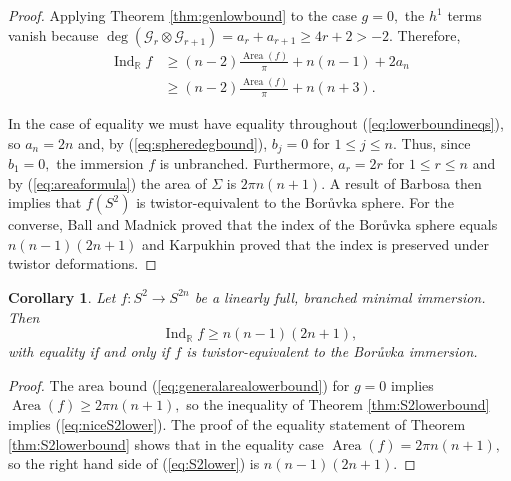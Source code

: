 \documentclass[11pt]{article}
\newtheorem{cor}[theorem]{Corollary}
\theoremstyle{definition}
\newcommand{\R}{\mathbb{R}}
\numberwithin{equation}{section}
\begin{document}
\begin{proof} 
	Applying Theorem \ref{thm:genlowbound} to the case $g=0,$ the $h^1$ terms vanish because $\deg (\mathcal{G}_r \otimes \mathcal{G}_{r+1}) = a_r+a_{r+1} \geq 4r+2 > -2.$ Therefore,
	\begin{equation}\label{eq:lowerboundineqs}
		\begin{aligned}
			\operatorname{Ind}_\R f & \geq (n-2) \frac{\operatorname{Area}(f)}{\pi} + n(n-1) + 2a_n \\
			                  & \geq (n-2) \frac{\operatorname{Area}(f)}{\pi} + {n(n+3)}.     
		\end{aligned}
	\end{equation}
	
	In the case of equality we must have equality throughout (\ref{eq:lowerboundineqs}), so $a_n = 2n$ and, by (\ref{eq:spheredegbound}), $b_j = 0$ for $1 \leq j \leq n.$ Thus, since $b_1 = 0,$ the immersion $f$ is unbranched. Furthermore, $a_r = 2r$ for $1 \leq r \leq n$ and by (\ref{eq:areaformula}) the area of $\Sigma$ is $2 \pi n(n+1).$ A result of Barbosa \cite{Barbosa75} then implies that $f(S^2)$ is twistor-equivalent to the Bor\r{u}vka sphere. For the converse, Ball and Madnick \cite{BallMadnick26} proved that the index of the Bor\r{u}vka sphere equals $n(n-1)(2n+1)$ and Karpukhin \cite[Cor 3.10]{Karpukhin21} proved that the index is preserved under twistor deformations.
\end{proof}

\begin{cor}\label{cor:S2boruvlowerindex}
	Let $f: S^2 \to S^{2n}$ be a linearly full, branched minimal immersion. Then
	\begin{equation}\label{eq:niceS2lower}
		\operatorname{Ind}_\R f \geq n(n-1)(2n+1),
	\end{equation}
	with equality if and only if $f$ is twistor-equivalent to the Bor\r{u}vka immersion.
\end{cor}

\begin{proof}
	The area bound (\ref{eq:generalarealowerbound}) for $g=0$ implies $\operatorname{Area}(f) \geq 2 \pi n(n+1),$ so the inequality of Theorem \ref{thm:S2lowerbound} implies (\ref{eq:niceS2lower}). The proof of the equality statement of Theorem \ref{thm:S2lowerbound} shows that in the equality case $\operatorname{Area}(f) = 2 \pi n(n+1),$ so the right hand side of (\ref{eq:S2lower}) is $n(n-1)(2n+1).$
\end{proof}
\end{document}
